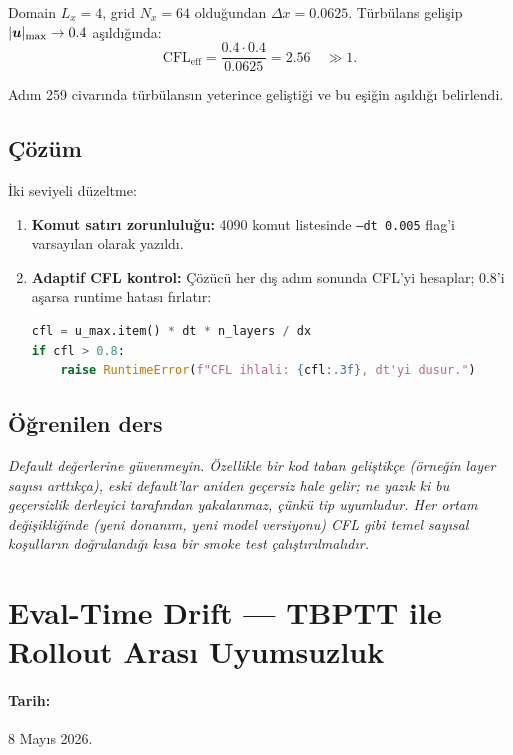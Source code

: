 Domain $L_x = 4$, grid $N_x = 64$ olduğundan $\Delta x = 0.0625$. Türbülans gelişip $|\bm{u}|_{\max} \to 0.4$ aşıldığında:
\begin{equation}
    \mathrm{CFL}_{\text{eff}} = \frac{0.4 \cdot 0.4}{0.0625} = 2.56 \quad \gg 1.
\end{equation}

Adım 259 civarında türbülansın yeterince geliştiği ve bu eşiğin aşıldığı belirlendi.

\subsection*{Çözüm}

İki seviyeli düzeltme:
\begin{enumerate}
    \item \textbf{Komut satırı zorunluluğu:} 4090 komut listesinde \texttt{--dt 0.005} flag'i varsayılan olarak yazıldı.
    \item \textbf{Adaptif CFL kontrol:} Çözücü her dış adım sonunda CFL'yi hesaplar; 0.8'i aşarsa runtime hatası fırlatır:
    \begin{lstlisting}[language=Python]
cfl = u_max.item() * dt * n_layers / dx
if cfl > 0.8:
    raise RuntimeError(f"CFL ihlali: {cfl:.3f}, dt'yi dusur.")
    \end{lstlisting}
\end{enumerate}

\subsection*{Öğrenilen ders}

\begin{remark}
\textit{Default değerlerine güvenmeyin. Özellikle bir kod taban geliştikçe (örneğin layer sayısı arttıkça), eski default'lar aniden \textit{geçersiz} hale gelir; ne yazık ki bu geçersizlik derleyici tarafından yakalanmaz, çünkü tip uyumludur. Her ortam değişikliğinde (yeni donanım, yeni model versiyonu) CFL gibi temel sayısal koşulların doğrulandığı kısa bir smoke test çalıştırılmalıdır.}
\end{remark}


\section{Eval-Time Drift --- TBPTT ile Rollout Arası Uyumsuzluk}
\label{sec:bug_eval_drift}

\paragraph{Tarih:} 8 Mayıs 2026.

